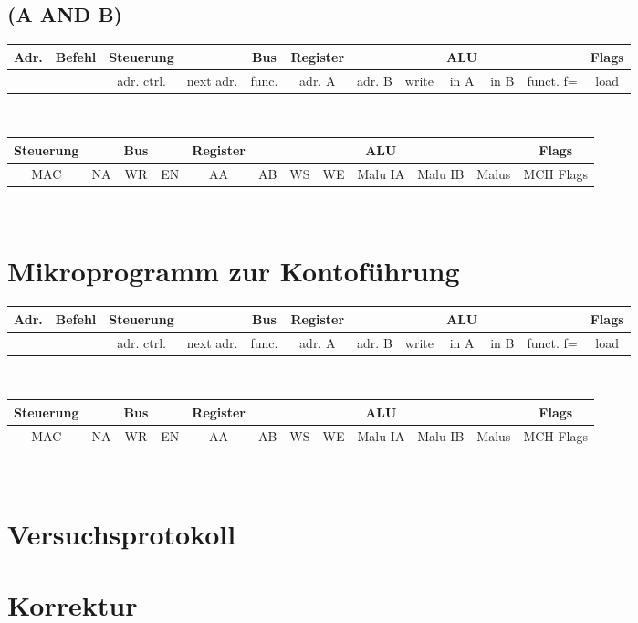 \documentclass[paper=a4, fontsize=11pt]{scrartcl}
\numberwithin{equation}{section}
\numberwithin{figure}{section}
\numberwithin{table}{section}
\begin{document}
\subsection{(A AND B)}

\begin{tabular}{|c|c|cc|c|ccc|ccc|c|}
\hline
Adr. & Befehl &Steuerung & & Bus & Register & & & ALU & & & Flags \\
\hline
& & adr. ctrl. & next adr. & func. & adr. A & adr. B & write & in A & in B & funct. f= & load \\
\hline
\end{tabular} \\

\begin{tabular}{|cc|cc|cccc|ccc|c|}
\hline
Steuerung & & Bus & & Register & & & & ALU & & & Flags \\
\hline
MAC & NA & WR & EN & AA & AB & WS & WE & Malu IA & Malu IB & Malus & MCH Flags \\
\hline
\end{tabular} \\


\newpage

\section{Mikroprogramm zur Kontoführung}

\begin{tabular}{|c|c|cc|c|ccc|ccc|c|}
\hline
Adr. & Befehl &Steuerung & & Bus & Register & & & ALU & & & Flags \\
\hline
& & adr. ctrl. & next adr. & func. & adr. A & adr. B & write & in A & in B & funct. f= & load \\
\hline
\end{tabular} \\

\begin{tabular}{|cc|cc|cccc|ccc|c|}
\hline
Steuerung & & Bus & & Register & & & & ALU & & & Flags \\
\hline
MAC & NA & WR & EN & AA & AB & WS & WE & Malu IA & Malu IB & Malus & MCH Flags \\
\hline
\end{tabular} \\


\newpage

\section{Versuchsprotokoll}


\newpage

\section{Korrektur}
\end{document}
